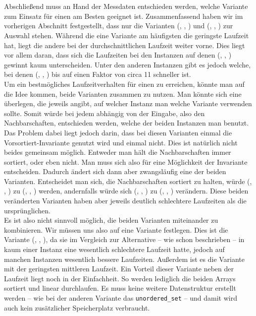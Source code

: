 \section{}
\label{sec:entscheidung}
Abschließend muss an Hand der Messdaten entschieden werden, welche Variante zum Einsatz für
einen \ct{} am Besten geeignet ist.
Zusammenfassend haben wir im vorherigen Abschnitt festgestellt, 
dass nur die Varianten (\SorSor, \true, \distr) und (\SeaUSet, \false, \perm) zur Auswahl stehen.
Während die eine Variante am häufigsten die geringste Laufzeit hat, liegt die andere 
bei der durchschnittlichen Laufzeit weiter vorne. Dies liegt vor allem daran, dass sich 
die Laufzeiten bei den Instanzen auf denen (\SeaUSet, \false, \perm) \glqq gewinnt\grqq{} kaum unterscheiden.
Unter den anderen Instanzen gibt es jedoch welche, bei denen (\SorSor, \true, \distr) bis auf einen
Faktor von circa 11 schneller ist.
\\
Um ein bestmögliches Laufzeitverhalten für einen \ct{} zu erreichen, könnte man auf die Idee kommen, 
beide Varianten zusammen zu nutzen. Man könnte sich eine  überlegen, die jeweils angibt, 
auf welcher Instanz man welche Variante verwenden sollte. Somit würde bei jedem \ct{} abhängig von 
der Eingabe, also den Nachbarschaften, entschieden werden, welche der beiden Instanzen man benutzt. 
Das Problem dabei liegt jedoch darin, dass bei diesen Varianten einmal die Vorsortiert-Invariante
genutzt wird und einmal nicht. Dies ist natürlich nicht beides gemeinsam möglich. Entweder man hält die
Nachbarschaften immer sortiert, oder eben nicht. Man muss sich also für eine Möglichkeit der
Invariante entscheiden. Dadurch ändert sich dann aber zwangsläufig  eine der beiden Varianten. 
Entscheidet man sich, die Nachbarschaften sortiert zu halten, würde (\SeaUSet, \false, \perm) zu (\SeaUSet, \true, \perm){}
werden, andernfalls würde sich (\SorSor, \true, \distr) zu (\SorSor, \false, \distr) verändern.
Diese beiden \glqq veränderten \grqq{} Varianten haben aber jeweils deutlich schlechtere Laufzeiten
als die ursprünglichen.
\\
Es ist also nicht sinnvoll möglich, die beiden Varianten miteinander zu kombinieren. Wir müssen uns
also auf eine Variante festlegen. Dies ist die Variante (\SorSor, \true, \distr), da sie im Vergleich zur
Alternative -- wie schon beschrieben --
in kaum einer Instanz eine wesentlich schlechtere Laufzeit hatte, jedoch auf manchen Instanzen wesentlich
bessere Laufzeiten. Außerdem ist es die Variante mit der geringsten mittleren Laufzeit. 
Ein Vorteil dieser Variante neben der Laufzeit liegt noch in der Einfachheit. So werden
lediglich die beiden Arrays sortiert und linear durchlaufen. Es muss keine weitere Datenstruktur
erstellt werden -- wie bei der anderen Variante das \texttt{unordered\_set} -- und damit wird
auch kein zusätzlicher Speicherplatz verbraucht.


